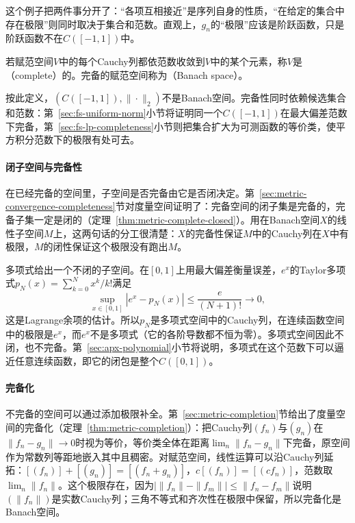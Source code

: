 这个例子把两件事分开了：“各项互相接近”是序列自身的性质，“在给定的集合中存在极限”则同时取决于集合和范数。直观上，$g_n$的“极限”应该是阶跃函数，只是阶跃函数不在$C([-1,1])$中。

\begin{definition}[Banach空间]
\label{def:fs-banach}
若赋范空间$V$中的每个Cauchy列都依范数收敛到$V$中的某个元素，称$V$是（complete）的。完备的赋范空间称为（Banach space）。
\end{definition}

按此定义，$(C([-1,1]),\|\cdot\|_2)$不是Banach空间。完备性同时依赖候选集合和范数：第~\ref{sec:fs-uniform-norm}小节将证明同一个$C([-1,1])$在最大偏差范数下完备，第~\ref{sec:fs-lp-completeness}小节则把集合扩大为可测函数的等价类，使平方积分范数下的极限有处可去。

\paragraph{闭子空间与完备性}
在已经完备的空间里，子空间是否完备由它是否闭决定。第~\ref{sec:metric-convergence-completeness}节对度量空间证明了：完备空间的闭子集是完备的，完备子集一定是闭的（定理~\ref{thm:metric-complete-closed}）。用在Banach空间$X$的线性子空间$M$上，这两句话的分工很清楚：$X$的完备性保证$M$中的Cauchy列在$X$中有极限，$M$的闭性保证这个极限没有跑出$M$。

多项式给出一个不闭的子空间。在$[0,1]$上用最大偏差衡量误差，$e^x$的Taylor多项式$p_N(x)=\sum_{k=0}^Nx^k/k!$满足
\[
 \sup_{x\in[0,1]}|e^x-p_N(x)|\leq\frac{e}{(N+1)!}\to0,
\]
这是Lagrange余项的估计。所以$p_N$是多项式空间中的Cauchy列，在连续函数空间中的极限是$e^x$，而$e^x$不是多项式（它的各阶导数都不恒为零）。多项式空间因此不闭，也不完备。第~\ref{sec:apx-polynomial}小节将说明，多项式在这个范数下可以逼近任意连续函数，即它的闭包是整个$C([0,1])$。

\paragraph{完备化}
不完备的空间可以通过添加极限补全。第~\ref{sec:metric-completion}节给出了度量空间的完备化（定理~\ref{thm:metric-completion}）：把Cauchy列$(f_n)$与$(g_n)$在$\|f_n-g_n\|\to0$时视为等价，等价类全体在距离$\lim_n\|f_n-g_n\|$下完备，原空间作为常数列等距地嵌入其中且稠密。对赋范空间，线性运算可以沿Cauchy列延拓：$[(f_n)]+[(g_n)]=[(f_n+g_n)]$，$c[(f_n)]=[(cf_n)]$，范数取$\lim_n\|f_n\|$。这个极限存在，因为$\bigl|\|f_n\|-\|f_m\|\bigr|\leq\|f_n-f_m\|$说明$(\|f_n\|)$是实数Cauchy列；三角不等式和齐次性在极限中保留，所以完备化是Banach空间。

